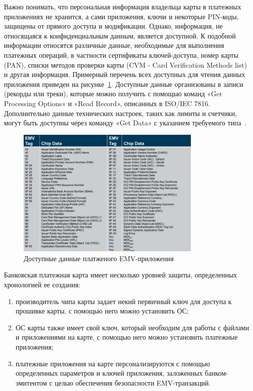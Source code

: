 Важно понимать, что персональная информация владельца карты в платежных приложениях не хранится, а сами приложения, ключи и некоторые PIN-коды, защищены от прямого доступа и модификации.
Однако, информация, не относящаяся к конфиденциальным данным, является доступной.
К подобной информации относятся различные данные, необходимые для выполнения платежных операций, в частности сертификаты ключей-доступа, номер карты (PAN), списки методов проверки карты (CVM - Card Verification Methods list) и другая информация.
Примерный перечень всех доступных для чтения данных приложения приведен на рисунке~\ref{fig:emv_available_data}.
Доступные данные организованы в записи (рекорды или треки), которые можно получить с помощью команд «Get Processing Options» и «Read Record», описанных  в ISO/IEC 7816.
Дополнительно данные технических настроек, таких как лимиты и счетчики, могут быть доступны через команду «Get Data» с указанием требуемого типа~\cite{emv_card_mechanism}.

\begin{figure}
    \centering
    \includegraphics[width=0.8\textwidth]{images/research/emv_available_data}
    \caption{\centering Доступные данные платженого EMV-приложения}
    \label{fig:emv_available_data}
\end{figure}

Банковская платежная карта имеет несколько уровней защиты, определенных хронологией ее создания:

\begin{enumerate}
    \item производитель чипа карты задает некий первичный ключ для доступа к прошивке карты, с помощью него можно установить ОС;
    \item ОС карты также имеет свой ключ, который необходим для работы с файлами и приложениями на карте, с помощью него можно установить платежные приложения;
    \item платежные приложения на карте персонализируются с помощью определенных параметров и ключей приложения, заложенных банком-эмитентом с целью обеспечения безопасности EMV-транзакций.
\end{enumerate}

